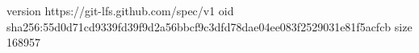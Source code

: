 version https://git-lfs.github.com/spec/v1
oid sha256:55d0d71cd9339fd39f9d2a56bbcf9c3dfd78dae04ee083f2529031e81f5acfcb
size 168957
